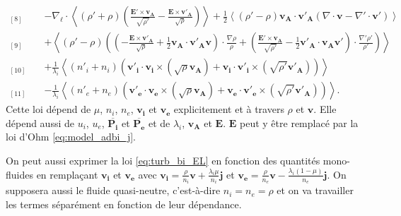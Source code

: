 \begin{equation}
{\begin{array}{ll}
{}_{[8]} \quad  &- \nabla_{\boldsymbol{\ell}} \cdot \left< \left(\rho' + \rho\right) \left(\frac{ \boldsymbol{E'}\times \boldsymbol{v_A} }{\sqrt{\rho'}} - \frac{ \boldsymbol{E}\times \boldsymbol{v'_A} }{\sqrt{\rho}}\right)\right> +  \frac{1}{2}\left<\left(\rho' - \rho\right) \boldsymbol{v_A} \cdot \boldsymbol{v'_{A}} \left(  \nabla \cdot \boldsymbol{v}-  \nabla' \cdot \boldsymbol{v'}\right)\right> \\ %
{}_{[9]} \quad  &+ \left<\left(\rho' - \rho\right) \left(\left(-\frac{ \boldsymbol{E}\times \boldsymbol{v'_A} }{\sqrt{\rho}} + \frac{1}{2}\boldsymbol{v_A} \cdot \boldsymbol{v'_{A}} \boldsymbol{v}\right) \cdot \frac{\nabla  \rho }{\rho}+\left(\frac{ \boldsymbol{E'}\times \boldsymbol{v_A} }{\sqrt{\rho'}} - \frac{1}{2}\boldsymbol{v'_A} \cdot \boldsymbol{v_{A}} \boldsymbol{v'}\right) \cdot \frac{\nabla'  \rho' }{\rho'}\right)\right> \\ %
{}_{[10]} \quad  &+ \frac{1}{\lambda_i} \left<\left(n'_i + n_i\right)\left(  \boldsymbol{v'_i} \cdot \boldsymbol{v_i} \times \left(\sqrt{\rho}\boldsymbol{v_A}\right) +  \boldsymbol{v_i} \cdot \boldsymbol{v'_i} \times \left( \sqrt{\rho'}\boldsymbol{v'_A}\right)\right) \right> \\ %
{}_{[11]} \quad  &- \frac{1}{\lambda_i} \left<\left(n'_e + n_e\right)\left(  \boldsymbol{v'_e} \cdot \boldsymbol{v_e} \times \left(\sqrt{\rho}\boldsymbol{v_A}\right) +  \boldsymbol{v_e} \cdot \boldsymbol{v'_e} \times \left( \sqrt{\rho'}\boldsymbol{v'_A}\right)\right)\right>.
\end{array}}\end{equation} %
Cette loi dépend de  $\mu$, $n_i$, $n_e$, $\boldsymbol{v_i}$ et $\boldsymbol{v_e}$ explicitement et à travers $\rho$ et $\boldsymbol{v}$. Elle dépend aussi de $u_i$, $u_e$, $\overline{\boldsymbol{P_i}}$ et $\overline{\boldsymbol{P_e}}$ et de $\lambda_i$, $\boldsymbol{v_A}$ et $\boldsymbol{E}$. $\boldsymbol{E}$ peut y être remplacé par la loi d'Ohm \eqref{eq:model_adbi_j}.

 On peut aussi exprimer la loi \eqref{eq:turb_bi_EL} en fonction des quantités mono-fluides en remplaçant $\boldsymbol{v_i}$ et $\boldsymbol{v_e}$ avec $\boldsymbol{v_i} = \frac{\rho}{n_i} \boldsymbol{v} + \frac{\lambda_i\mu}{  n_i} \boldsymbol{j}$ et $\boldsymbol{v_e} = \frac{\rho}{n_e} \boldsymbol{v} - \frac{\lambda_i (1-\mu)}{n_e} \boldsymbol{j}$. On supposera aussi le fluide quasi-neutre, c'est-à-dire $n_i = n_e = \rho$ et on va travailler les termes séparément en fonction de leur dépendance. 
 
